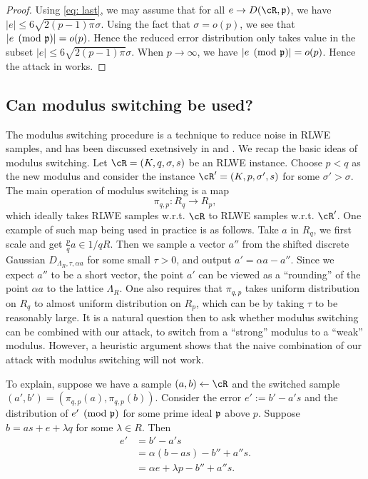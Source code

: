 \documentclass{amsart}
\begin{document}
\begin{proof}
Using \ref{eq: last}, we may assume that for all $e \to D(\cR,\fp)$, we have $|e|\leq 6\sqrt{2(p-1)\pi} \sigma$. Using the fact that $\sigma = o(p)$, we see that $|e \pmod{\mathfrak{p}}| = o(p)$. Hence the reduced error distribution only takes value in the subset
$|e|\leq 6\sqrt{2(p-1)\pi} \sigma$. When $p \to \infty$, we have $|e \pmod {\mathfrak{p}}| = o(p)$.  Hence the attack in \cite{elos2015weak} works.
\end{proof}
\fi

\subsection{Can modulus switching be used?}
The modulus switching procedure is a technique to reduce noise
in RLWE samples, and has been discussed exetnsively in  \cite{brakerski2012leveled} and \cite{langlois2014worst}.
We recap the basic ideas of modulus switching. Let $\cR = (K, q, \sigma, s)$ be an RLWE instance. Choose $p < q$ as the new modulus and consider the instance $\cR' = (K,p,\sigma',s)$ for some $\sigma' > \sigma$. The main operation of modulus switching is a map
\[
\pi_{q,p} : R_q \to R_p,
\]
which ideally takes RLWE samples w.r.t. $\cR$ to RLWE samples w.r.t. $\cR'$. One example of such map being used in practice is as follows. Take $a$ in $R_q$, we first scale and get $\frac{p}{q}a \in 1/q R$. Then we sample a vector $a''$ from the shifted discrete Gaussian $D_{\Lambda_R, \tau, \alpha a}$ for some small $\tau > 0$, and output $a' = \alpha a - a''$. Since we expect $a''$ to be a  short vector, the point $a'$ can be viewed as a ``rounding'' of the point $\alpha a$ to the lattice $\Lambda_R$. One also requires that $\pi_{q,p}$ takes uniform distribution on $R_q$ to almost uniform distribution on $R_p$, which can be by taking $\tau$ to be reasonably large. It is a natural question then to ask whether modulus switching can be combined with our attack, to switch from a ``strong'' modulus to a ``weak'' modulus. However, a heuristic argument shows that the naive combination of our attack with modulus switching will not work.

To explain, suppose we have a sample $(a,b) \gets \cR$ and the switched sample $(a', b') = (\pi_{q,p}(a),\pi_{q,p}(b))$. Consider the error $e':= b' - a's$ and the distribution of $e' \pmod{\mathfrak{p}}$ for some prime ideal $\mathfrak{p}$ above $p$. Suppose $b = as+e+ \lambda q$ for some $\lambda \in R$. Then
\begin{align*}
    e' &= b' - a's  \\
    &= \alpha(b-as) - b''  + a''s. \\
    & = \alpha e + \lambda p - b'' + a''s.
\end{align*}
\end{document}

